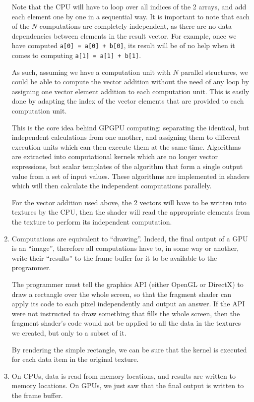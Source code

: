 \documentclass[10pt, a4paper]{report}
\begin{document}
\begin{enumerate}
Note that the CPU will have to loop over all indices of the 2 arrays, and add
each element one by one in a sequential way.
It is important to note that each of the $N$ computations are completely
independent, as there are no data dependencies between elements in the result
vector.
For example, once we have computed \verb!a[0] = a[0] + b[0]!, its result will be
of no help when it comes to computing \verb!a[1] = a[1] + b[1]!.

As such, assuming we have a computation unit with $N$ parallel structures, we
could be able to compute the vector addition without the need of any loop by
assigning one vector element addition to each computation unit.
This is easily done by adapting the index of the vector elements that are
provided to each computation unit.

This is the core idea behind GPGPU computing: separating the identical, but
independent calculations from one another, and assigning them to different
execution units which can then execute them at the same time.
Algorithms are extracted into computational kernels which are no longer vector
expressions, but scalar templates of the algorithm that form a single output
value from a set of input values.
These algorithms are implemented in shaders which will then calculate the
independent computations parallely.

For the vector addition used above, the 2 vectors will have to be written into
textures by the CPU, then the shader will read the appropriate elements from the
texture to perform its independent computation.

\item Computations are equivalent to ``drawing''.
Indeed, the final output of a GPU is an ``image'', therefore all computations
have to, in some way or another, write their ``results'' to the frame buffer for
it to be available to the programmer.

The programmer must tell the graphics API (either OpenGL or DirectX) to draw a
rectangle over the whole screen, so that the fragment shader can apply its code
to each pixel independently and output an answer.
If the API were not instructed to draw something that fills the whole screen,
then the fragment shader's code would not be applied to all the data in the
textures we created, but only to a subset of it.

By rendering the simple rectangle, we can be sure that the kernel is executed
for each data item in the original texture.

\item On CPUs, data is read from memory locations, and results are written to
memory locations.
On GPUs, we just saw that the final output is written to the frame buffer.


\end{enumerate}
\end{document}
